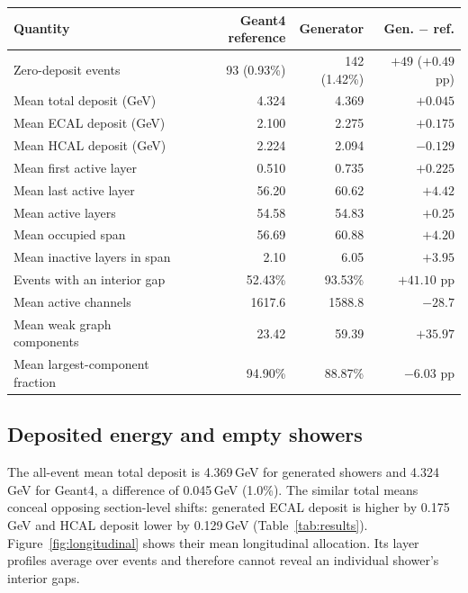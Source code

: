 \documentclass[11pt]{article}
\begin{document}
\begin{center}
\begin{minipage}{\linewidth}
\centering
{}
\label{tab:results}
\small
\begin{tabular}{@{}lrrr@{}}
\toprule
Quantity & Geant4 reference & Generator & Gen. $-$ ref. \\
\midrule
Zero-deposit events & 93 (0.93\%) & 142 (1.42\%) & $+49$ ($+0.49$ pp) \\
Mean total deposit (GeV) & 4.324 & 4.369 & $+0.045$ \\
Mean ECAL deposit (GeV) & 2.100 & 2.275 & $+0.175$ \\
Mean HCAL deposit (GeV) & 2.224 & 2.094 & $-0.129$ \\
\midrule
Mean first active layer & 0.510 & 0.735 & $+0.225$ \\
Mean last active layer & 56.20 & 60.62 & $+4.42$ \\
Mean active layers & 54.58 & 54.83 & $+0.25$ \\
Mean occupied span & 56.69 & 60.88 & $+4.20$ \\
Mean inactive layers in span & 2.10 & 6.05 & $+3.95$ \\
Events with an interior gap & 52.43\% & 93.53\% & $+41.10$ pp \\
Mean active channels & 1617.6 & 1588.8 & $-28.7$ \\
Mean weak graph components & 23.42 & 59.39 & $+35.97$ \\
Mean largest-component fraction & 94.90\% & 88.87\% & $-6.03$ pp \\
\bottomrule
\end{tabular}
\end{minipage}
\end{center}

\subsection{Deposited energy and empty showers}

The all-event mean total deposit is 4.369\,GeV for generated showers and 4.324\,GeV for Geant4, a difference of 0.045\,GeV (1.0\%). The similar total means conceal opposing section-level shifts: generated ECAL deposit is higher by 0.175\,GeV and HCAL deposit lower by 0.129\,GeV (Table~\ref{tab:results}). Figure~\ref{fig:longitudinal} shows their mean longitudinal allocation. Its layer profiles average over events and therefore cannot reveal an individual shower's interior gaps.
\end{document}
